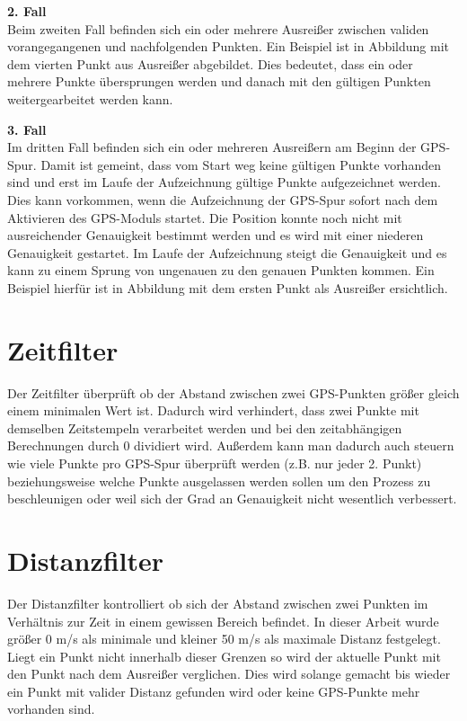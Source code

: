 \textbf{2. Fall}\\
Beim zweiten Fall befinden sich ein oder mehrere Ausreißer zwischen validen vorangegangenen und nachfolgenden Punkten. Ein Beispiel ist in Abbildung  mit dem vierten Punkt aus Ausreißer abgebildet. Dies bedeutet, dass ein oder mehrere Punkte übersprungen werden und danach mit den gültigen Punkten weitergearbeitet werden kann.


\textbf{3. Fall}\\
Im dritten Fall befinden sich ein oder mehreren Ausreißern am Beginn der GPS-Spur. Damit ist gemeint, dass vom Start weg keine gültigen Punkte vorhanden sind und erst im Laufe der Aufzeichnung gültige Punkte aufgezeichnet werden. Dies kann vorkommen, wenn die Aufzeichnung der GPS-Spur sofort nach dem Aktivieren des GPS-Moduls startet. Die Position konnte noch nicht mit ausreichender Genauigkeit bestimmt werden und es wird mit einer niederen Genauigkeit gestartet. Im Laufe der Aufzeichnung steigt die Genauigkeit und es kann zu einem Sprung von ungenauen zu den genauen Punkten kommen. Ein Beispiel hierfür ist in Abbildung  mit dem ersten Punkt als Ausreißer ersichtlich.



\section{Zeitfilter}
Der Zeitfilter überprüft ob der Abstand zwischen zwei GPS-Punkten größer gleich einem minimalen Wert ist. Dadurch wird verhindert, dass zwei Punkte mit demselben Zeitstempeln verarbeitet werden und bei den zeitabhängigen Berechnungen durch 0 dividiert wird. Außerdem kann man dadurch auch steuern wie viele Punkte pro GPS-Spur überprüft werden  (z.B. nur jeder 2. Punkt) beziehungsweise welche Punkte ausgelassen werden sollen um den Prozess zu beschleunigen oder weil sich der Grad an Genauigkeit nicht wesentlich verbessert.

\section{Distanzfilter}
Der Distanzfilter kontrolliert ob sich der Abstand zwischen zwei Punkten im Verhältnis zur Zeit in einem gewissen Bereich befindet. In dieser Arbeit wurde größer 0 m/s als minimale und kleiner 50 m/s als maximale Distanz festgelegt. Liegt ein Punkt nicht innerhalb dieser Grenzen so wird der aktuelle Punkt mit den Punkt nach dem Ausreißer verglichen. Dies wird solange gemacht bis wieder ein Punkt mit valider Distanz gefunden wird oder keine GPS-Punkte mehr vorhanden sind.

